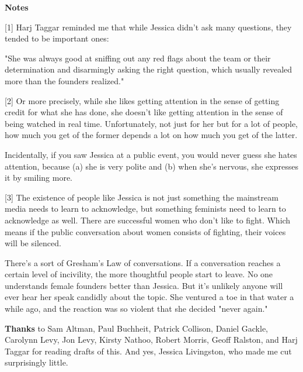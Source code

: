 \textbf{Notes}

[1] Harj Taggar reminded me that while Jessica didn't ask many
                  questions, they tended to be important ones:

"She
                  was always good at sniffing out any red flags about the team
                  or their determination and disarmingly asking the right
                  question, which usually revealed more than the founders
                  realized."

[2] Or more precisely, while she likes getting attention in the
                  sense of getting credit for what she has done, she doesn't
                  like getting attention in the sense of being watched in real
                  time. Unfortunately, not just for her but for a lot of people,
                  how much you get of the former depends a lot on how much you
                  get of the latter.

Incidentally, if you saw Jessica
                  at a public event, you would never guess she hates attention,
                  because (a) she is very polite and (b) when she's nervous, she
                  expresses it by smiling more.

[3] The existence of people like Jessica is not just something
                  the mainstream media needs to learn to acknowledge, but
                  something feminists need to learn to acknowledge as well.
                  There are successful women who don't like to fight. Which
                  means if the public conversation about women consists of
                  fighting, their voices will be silenced.

There's a
                  sort of Gresham's Law of conversations. If a conversation
                  reaches a certain level of incivility, the more thoughtful
                  people start to leave. No one understands female founders
                  better than Jessica. But it's unlikely anyone will ever hear
                  her speak candidly about the topic. She ventured a toe in that
                  water a while ago, and the reaction was so violent that she
                  decided "never again."


                  \textbf{Thanks} to Sam Altman, Paul Buchheit, Patrick Collison,
                  Daniel Gackle, Carolynn Levy, Jon Levy, Kirsty Nathoo, Robert
                  Morris, Geoff Ralston, and Harj Taggar for reading drafts of
                  this. And yes, Jessica Livingston, who made me cut
                  surprisingly little.




              
            
          
            
              
                


                  
              
            
          
